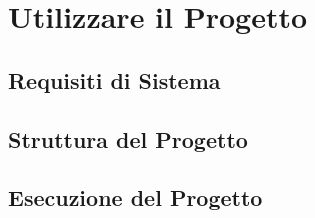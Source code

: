 \documentclass{article}
\begin{document}
\newpage
\section{Utilizzare il Progetto}

\subsection{Requisiti di Sistema}

\subsection{Struttura del Progetto}

\subsection{Esecuzione del Progetto}
\end{document}
